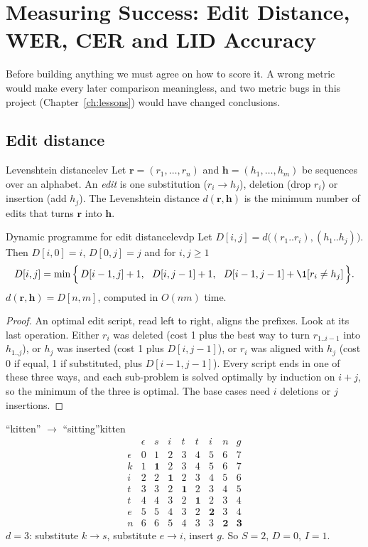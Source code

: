 \chapter{Measuring Success: Edit Distance, WER, CER and LID Accuracy}
\label{ch:metrics}

Before building anything we must agree on how to score it. A wrong metric would make every later comparison meaningless, and two
metric bugs in this project (Chapter~\ref{ch:lessons}) would have changed conclusions.

\section{Edit distance}

\begin{definition}{Levenshtein distance}{lev}
Let $\bm r=(r_1,\dots,r_n)$ and $\bm h=(h_1,\dots,h_m)$ be sequences over an alphabet. An \emph{edit} is one substitution
($r_i\to h_j$), deletion (drop $r_i$) or insertion (add $h_j$). The Levenshtein distance $d(\bm r,\bm h)$ is the minimum number of
edits that turns $\bm r$ into $\bm h$.
\end{definition}

\begin{theorem}{Dynamic programme for edit distance}{levdp}
Let $D[i,j]=d\big((r_1..r_i),(h_1..h_j)\big)$. Then $D[i,0]=i$, $D[0,j]=j$ and for $i,j\ge1$
\[
D[i,j]=\min\Big\{\,D[i-1,j]+1,\ \ D[i,j-1]+1,\ \ D[i-1,j-1]+\1[r_i\ne h_j]\,\Big\}.
\]
$d(\bm r,\bm h)=D[n,m]$, computed in $O(nm)$ time.
\end{theorem}
\begin{proof}
An optimal edit script, read left to right, aligns the prefixes. Look at its last operation. Either $r_i$ was deleted (cost 1 plus
the best way to turn $r_{1..i-1}$ into $h_{1..j}$), or $h_j$ was inserted (cost 1 plus $D[i,j-1]$), or $r_i$ was aligned with $h_j$
(cost 0 if equal, 1 if substituted, plus $D[i-1,j-1]$). Every script ends in one of these three ways, and each sub-problem is
solved optimally by induction on $i+j$, so the minimum of the three is optimal. The base cases need $i$ deletions or $j$ insertions.
\end{proof}

\begin{example}{``kitten'' $\to$ ``sitting''}{kitten}
\[
\begin{array}{c|cccccccc}
 & \epsilon & s & i & t & t & i & n & g\\\hline
\epsilon & 0&1&2&3&4&5&6&7\\
k & 1&\bm1&2&3&4&5&6&7\\
i & 2&2&\bm1&2&3&4&5&6\\
t & 3&3&2&\bm1&2&3&4&5\\
t & 4&4&3&2&\bm1&2&3&4\\
e & 5&5&4&3&2&\bm2&3&4\\
n & 6&6&5&4&3&3&\bm2&\bm3
\end{array}
\]
$d=3$: substitute $k\to s$, substitute $e\to i$, insert $g$. So $S=2$, $D=0$, $I=1$.
\end{example}

